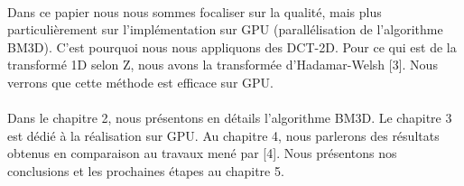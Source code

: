\paragraph{}
Dans ce papier nous nous sommes focaliser sur la qualité, mais plus particulièrement sur l'implémentation sur GPU (parallélisation de l'algorithme BM3D). C'est pourquoi nous nous appliquons des DCT-2D. Pour ce qui est de la transformé 1D selon Z, nous avons la transformée d'Hadamar-Welsh [3]. Nous verrons que cette méthode est efficace sur GPU. 
\paragraph{}
Dans le chapitre 2, nous présentons en détails l'algorithme BM3D. Le chapitre 3 est dédié à la réalisation sur GPU. Au chapitre 4, nous parlerons des résultats obtenus en comparaison au travaux mené par [4]. Nous présentons nos conclusions et les prochaines étapes au chapitre  5.     